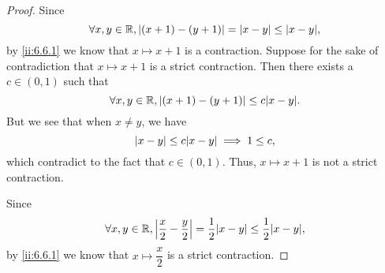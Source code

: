\begin{proof}
  Since
  \[
    \forall x, y \in \R, \abs{(x + 1) - (y + 1)} = \abs{x - y} \leq \abs{x - y},
  \]
  by \cref{ii:6.6.1} we know that \(x \mapsto x + 1\) is a contraction.
  Suppose for the sake of contradiction that \(x \mapsto x + 1\) is a strict contraction.
  Then there exists a \(c \in (0, 1)\) such that
  \[
    \forall x, y \in \R, \abs{(x + 1) - (y + 1)} \leq c \abs{x - y}.
  \]
  But we see that when \(x \neq y\), we have
  \[
    \abs{x - y} \leq c \abs{x - y} \implies 1 \leq c,
  \]
  which contradict to the fact that \(c \in (0, 1)\).
  Thus, \(x \mapsto x + 1\) is not a strict contraction.

  Since
  \[
    \forall x, y \in \R, \abs{\dfrac{x}{2} - \dfrac{y}{2}} = \dfrac{1}{2} \abs{x - y} \leq \dfrac{1}{2} \abs{x - y},
  \]
  by \cref{ii:6.6.1} we know that \(x \mapsto \dfrac{x}{2}\) is a strict contraction.


\end{proof}
